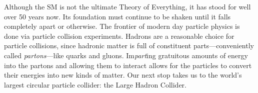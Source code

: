 Although the SM is not the ultimate Theory of Everything, it has stood for well over 50 years now.
Its foundation must continue to be shaken until it falls completely apart or otherwise.
The frontier of modern day particle physics is done via particle collision experiments.
Hadrons are a reasonable choice for particle collisions, since hadronic matter is full of constituent parts---conveniently called \emph{partons}---like quarks and gluons.
Im\emph{part}ing gratuitous amounts of energy into the partons and allowing them to interact allows for the particles to convert their energies into new kinds of matter.
Our next stop takes us to the world's largest circular particle collider: the Large Hadron Collider.


